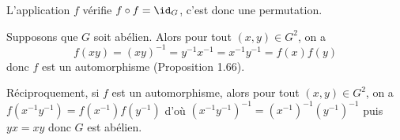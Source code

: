 L'application $f$ vérifie $f \circ f = \id_G$, c'est donc une permutation.

Supposons que $G$ soit abélien. Alors pour tout $(x,y)\in G^2$, on a
\[
  f(xy) = (xy)^{-1} = y^{-1}x^{-1} = x^{-1}y^{-1} = f(x) f(y)
\]
donc $f$ est un automorphisme (Proposition 1.66).

Réciproquement, si $f$ est un automorphisme, alors pour tout $(x,y)\in G^2$, on
a $f(x^{-1}y^{-1}) = f(x^{-1})f(y^{-1})$ d'où $(x^{-1}y^{-1})^{-1} =
(x^{-1})^{-1}(y^{-1})^{-1}$ puis $yx = xy$ donc $G$ est abélien.
